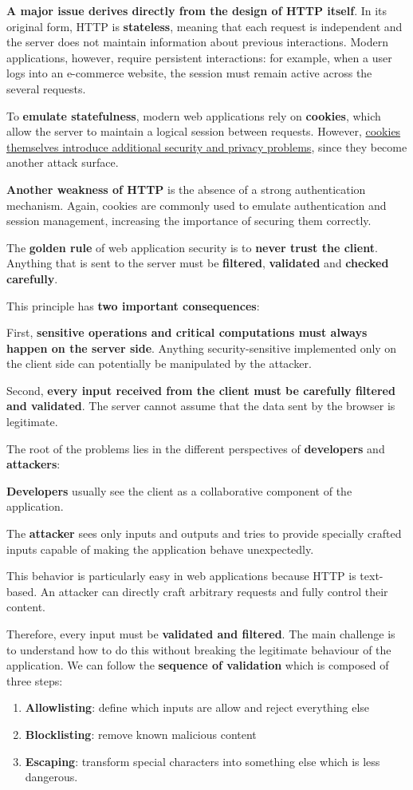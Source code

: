 \documentclass{article}
\begin{document}
\textbf{A major issue derives directly from the design of HTTP itself}. In its original form, HTTP is \textbf{stateless}, meaning that each request is independent and the server does not maintain information about previous interactions. Modern applications, however, require persistent interactions: for example, when a user logs into an e-commerce website, the session must remain active across the several requests.

To \textbf{emulate statefulness}, modern web applications rely on \textbf{cookies}, which allow the server to maintain a logical session between requests. However, \underline{cookies themselves introduce additional security and privacy problems}, since they become another attack surface.

\textbf{Another weakness of HTTP} is the absence of a strong authentication mechanism. Again, cookies are commonly used to emulate authentication and session management, increasing the importance of securing them correctly.

The \textbf{golden rule} of web application security is to \textbf{never trust the client}. Anything that is sent to the server must be \textbf{filtered}, \textbf{validated} and \textbf{checked carefully}.

This principle has \textbf{two important consequences}:

First, \textbf{sensitive operations and critical computations must always happen on the server side}. Anything security-sensitive implemented only on the client side can potentially be manipulated by the attacker.

Second, \textbf{every input received from the client must be carefully filtered and validated}. The server cannot assume that the data sent by the browser is legitimate.

The root of the problems lies in the different perspectives of \textbf{developers} and \textbf{attackers}:

\textbf{Developers} usually see the client as a collaborative component of the application. 

The \textbf{attacker} sees only inputs and outputs and tries to provide specially crafted inputs capable of making the application behave unexpectedly.

This behavior is particularly easy in web applications because HTTP is text-based. An attacker can directly craft arbitrary requests and fully control their content.

Therefore, every input must be \textbf{validated and filtered}. The main challenge is to understand how to do this without breaking the legitimate behaviour of the application. We can follow the \textbf{sequence of validation} which is composed of three steps:
\begin{enumerate}
    \item \textbf{Allowlisting}: define which inputs are allow and reject everything else
    \item \textbf{Blocklisting}: remove known malicious content
    \item \textbf{Escaping}: transform special characters into something else which is less dangerous.
\end{enumerate}
\end{document}
